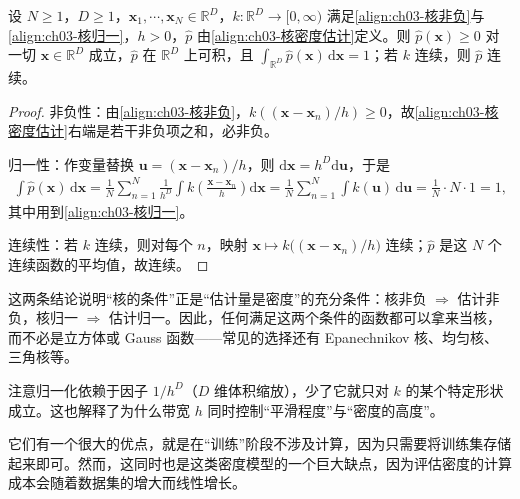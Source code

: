 \documentclass[../../main.tex]{subfiles}
\begin{document}
\begin{proposition}[核密度估计的归一性]\label{proposition:ch03-核密度归一}
设 $N\geqslant1$，$D\geqslant1$，$\boldsymbol{x}_1,\cdots,\boldsymbol{x}_N\in\mathbb{R}^{D}$，$k:\mathbb{R}^{D}\to[0,\infty)$ 满足\eqref{align:ch03-核非负}与\eqref{align:ch03-核归一}，$h>0$，$\hat{p}$ 由\eqref{align:ch03-核密度估计}定义。则 $\hat{p}(\boldsymbol{x})\geqslant0$ 对一切 $\boldsymbol{x}\in\mathbb{R}^{D}$ 成立，$\hat{p}$ 在 $\mathbb{R}^{D}$ 上可积，且 $\int_{\mathbb{R}^{D}}\hat{p}(\boldsymbol{x})\,\mathrm{d}\boldsymbol{x}=1$；若 $k$ 连续，则 $\hat{p}$ 连续。
\end{proposition}
\begin{proof}
非负性：由\eqref{align:ch03-核非负}，$k((\boldsymbol{x}-\boldsymbol{x}_n)/h)\geqslant0$，故\eqref{align:ch03-核密度估计}右端是若干非负项之和，必非负。

归一性：作变量替换 $\boldsymbol{u}=(\boldsymbol{x}-\boldsymbol{x}_n)/h$，则 $\mathrm{d}\boldsymbol{x}=h^{D}\mathrm{d}\boldsymbol{u}$，于是
\begin{align*}
\int\hat{p}(\boldsymbol{x})\,\mathrm{d}\boldsymbol{x}=\frac{1}{N}\sum_{n=1}^{N}\frac{1}{h^{D}}\int k\!\left(\frac{\boldsymbol{x}-\boldsymbol{x}_n}{h}\right)\mathrm{d}\boldsymbol{x}=\frac{1}{N}\sum_{n=1}^{N}\int k(\boldsymbol{u})\,\mathrm{d}\boldsymbol{u}=\frac{1}{N}\cdot N\cdot1=1,
\end{align*}
其中用到\eqref{align:ch03-核归一}。

连续性：若 $k$ 连续，则对每个 $n$，映射 $\boldsymbol{x}\mapsto k\bigl((\boldsymbol{x}-\boldsymbol{x}_n)/h\bigr)$ 连续；$\hat{p}$ 是这 $N$ 个连续函数的平均值，故连续。
\end{proof}

\begin{remark}
这两条结论说明“核的条件”正是“估计量是密度”的充分条件：核非负 $\Rightarrow$ 估计非负，核归一 $\Rightarrow$ 估计归一。因此，任何满足这两个条件的函数都可以拿来当核，而不必是立方体或 Gauss 函数——常见的选择还有 Epanechnikov 核、均匀核、三角核等。

注意归一化依赖于因子 $1/h^{D}$（$D$ 维体积缩放），少了它就只对 $k$ 的某个特定形状成立。这也解释了为什么带宽 $h$ 同时控制“平滑程度”与“密度的高度”。
\end{remark}

它们有一个很大的优点，就是在“训练”阶段不涉及计算，因为只需要将训练集存储起来即可。然而，这同时也是这类密度模型的一个巨大缺点，因为评估密度的计算成本会随着数据集的增大而线性增长。
\end{document}

